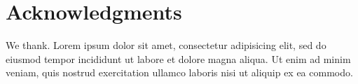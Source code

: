 \section*{Acknowledgments}

We thank. Lorem ipsum dolor sit amet, consectetur adipisicing elit,
sed do eiusmod tempor incididunt ut labore et dolore magna aliqua. Ut
enim ad minim veniam, quis nostrud exercitation ullamco laboris nisi
ut aliquip ex ea commodo.
